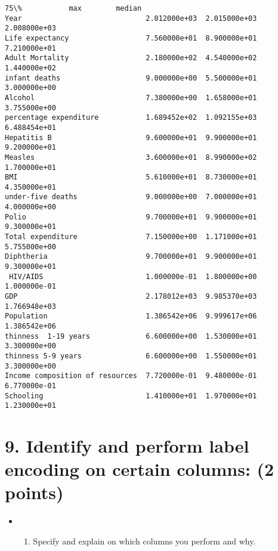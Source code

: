 \documentclass[11pt]{article}
\providecommand{\tightlist}{%
      \setlength{\itemsep}{0pt}\setlength{\parskip}{0pt}}
\begin{document}
\begin{Verbatim}[commandchars=\\\{\}]
                                          75\%           max        median
Year                             2.012000e+03  2.015000e+03  2.008000e+03
Life expectancy                  7.560000e+01  8.900000e+01  7.210000e+01
Adult Mortality                  2.180000e+02  4.540000e+02  1.440000e+02
infant deaths                    9.000000e+00  5.500000e+01  3.000000e+00
Alcohol                          7.380000e+00  1.658000e+01  3.755000e+00
percentage expenditure           1.689452e+02  1.092155e+03  6.488454e+01
Hepatitis B                      9.600000e+01  9.900000e+01  9.200000e+01
Measles                          3.600000e+01  8.990000e+02  1.700000e+01
BMI                              5.610000e+01  8.730000e+01  4.350000e+01
under-five deaths                9.000000e+00  7.000000e+01  4.000000e+00
Polio                            9.700000e+01  9.900000e+01  9.300000e+01
Total expenditure                7.150000e+00  1.171000e+01  5.755000e+00
Diphtheria                       9.700000e+01  9.900000e+01  9.300000e+01
 HIV/AIDS                        1.000000e-01  1.800000e+00  1.000000e-01
GDP                              2.178012e+03  9.985370e+03  1.766948e+03
Population                       1.386542e+06  9.999617e+06  1.386542e+06
thinness  1-19 years             6.600000e+00  1.530000e+01  3.300000e+00
thinness 5-9 years               6.600000e+00  1.550000e+01  3.300000e+00
Income composition of resources  7.720000e-01  9.480000e-01  6.770000e-01
Schooling                        1.410000e+01  1.970000e+01  1.230000e+01
    \end{Verbatim}

    \section{9. Identify and perform label encoding on certain columns: (2
points)}\label{identify-and-perform-label-encoding-on-certain-columns-2-points}

\begin{itemize}
\tightlist
\item
  \begin{enumerate}
  \def\labelenumi{(\alph{enumi})}
  \tightlist
  \item
    Specify and explain on which columns you perform and why.
  \end{enumerate}
\end{itemize}
\end{document}
